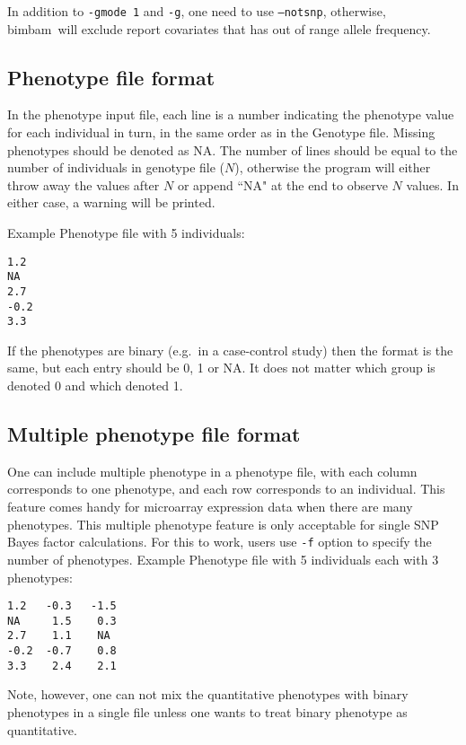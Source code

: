 \documentclass[11pt,Palatino]{article}
\def\bimbam{{\sc bimbam}~}
\begin{document}
In addition to {\tt -gmode 1} and {\tt -g}, one need to use {\tt --notsnp}, otherwise, \bimbam will exclude report covariates that has out of range allele frequency.  


\subsection{Phenotype file format}
In the phenotype input file, each line is a number indicating the phenotype value for each individual in turn, in the same order as in the Genotype file.
Missing phenotypes should be denoted as NA. The number of lines should be equal to the number of individuals in genotype file ($N$), otherwise the program will either throw away the values after $N$ or append ``NA" at the end to observe $N$ values. In either case, a warning will be printed.

Example Phenotype file with 5 individuals:

\begin{verbatim}
1.2
NA
2.7
-0.2
3.3
\end{verbatim}
If the phenotypes are binary (e.g.~in a case-control study) then the format is the same, but each entry should be 0, 1 or NA. It does not matter which group is denoted 0 and which denoted 1.

\subsection{Multiple phenotype file format}
One can include multiple phenotype in a phenotype file, with each column corresponds to one phenotype, and each row corresponds to an individual. This feature comes handy for microarray expression data when there are many phenotypes. This multiple phenotype feature is only acceptable for single SNP Bayes factor calculations.  For this to work, users use {\tt -f} option to specify the number of phenotypes. 
Example Phenotype file with 5 individuals each with 3 phenotypes: 
 \begin{verbatim}
1.2   -0.3   -1.5
NA     1.5    0.3 
2.7    1.1    NA
-0.2  -0.7    0.8
3.3    2.4    2.1
\end{verbatim}
Note, however, one can not mix the quantitative phenotypes with binary phenotypes in a single file unless one wants to treat binary phenotype as quantitative. 
 
\end{document}
